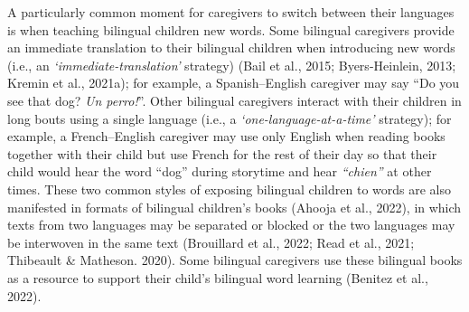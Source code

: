 \documentclass[
  man,floatsintext]{apa7}
\begin{document}
A particularly common moment for caregivers to switch between their languages is when teaching bilingual children new words. Some bilingual caregivers provide an immediate translation to their bilingual children when introducing new words (i.e., an \emph{`immediate-translation'} strategy) (Bail et al., 2015; Byers-Heinlein, 2013; Kremin et al., 2021a); for example, a Spanish--English caregiver may say ``Do you see that dog? \emph{Un perro!}''. Other bilingual caregivers interact with their children in long bouts using a single language (i.e., a \emph{`one-language-at-a-time'} strategy); for example, a French--English caregiver may use only English when reading books together with their child but use French for the rest of their day so that their child would hear the word ``dog'' during storytime and hear \emph{``chien''} at other times. These two common styles of exposing bilingual children to words are also manifested in formats of bilingual children's books (Ahooja et al., 2022), in which texts from two languages may be separated or blocked or the two languages may be interwoven in the same text (Brouillard et al., 2022; Read et al., 2021; Thibeault \& Matheson. 2020). Some bilingual caregivers use these bilingual books as a resource to support their child's bilingual word learning (Benitez et al., 2022).
\end{document}
